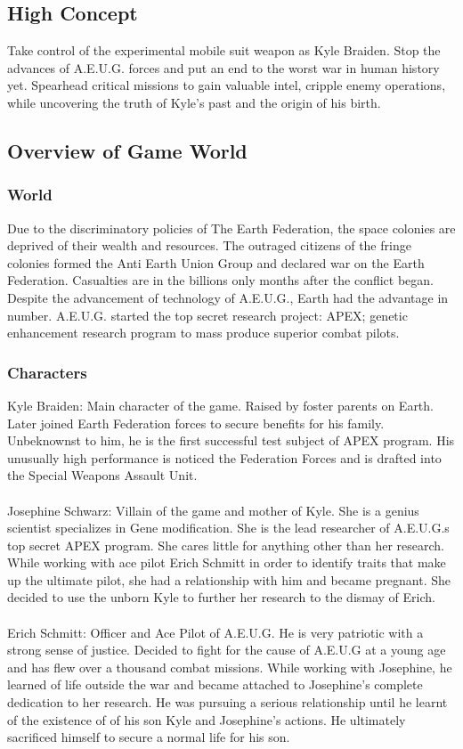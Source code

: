 \documentclass{article}
\begin{document}
\subsection*{High Concept}
Take control of the experimental mobile suit weapon as Kyle Braiden. Stop the advances of A.E.U.G. forces and put an end to the worst war in human history yet. Spearhead critical missions to gain valuable intel, cripple enemy operations, while uncovering the truth of Kyle’s past and the origin of his birth.

\subsection*{Overview of Game World}
    \subsubsection*{World}
     Due to the discriminatory policies of The Earth Federation, the space colonies are deprived of their wealth and resources. The outraged citizens of the fringe colonies formed the Anti Earth Union Group and declared war on the Earth Federation. Casualties are in the billions only months after the conflict began.
    Despite the advancement of technology of A.E.U.G., Earth had the advantage in number. A.E.U.G. started the top secret research project: APEX; genetic enhancement research program to mass produce superior combat pilots.
    \subsubsection*{Characters}
    Kyle Braiden: Main character of the game. Raised by foster parents on Earth. Later joined Earth Federation forces to secure benefits for his family. Unbeknownst to him, he is the first successful test subject of APEX program. His unusually high performance is noticed the Federation Forces and is drafted into the Special Weapons Assault Unit.\\\\
    Josephine Schwarz: Villain of the game and mother of Kyle. She is a genius scientist specializes in Gene modification. She is the lead researcher of A.E.U.G.s top secret APEX program. She cares little for anything other than her research. While working with ace pilot Erich Schmitt in order to identify traits that make up the ultimate pilot, she had a relationship with him and became pregnant. She decided to use the unborn Kyle to further her research to the dismay of Erich.\\\\
    Erich Schmitt: Officer and Ace Pilot of A.E.U.G. He is very patriotic with a strong sense of justice. Decided to fight for the cause of A.E.U.G at a young age and has flew over a thousand combat missions. While working with Josephine, he learned of life outside the war and became attached to Josephine’s complete dedication to her research. He was pursuing a serious relationship until he learnt of the existence of of his son Kyle and Josephine’s actions. He ultimately sacrificed himself to secure a normal life for his son.
    
\end{document}
